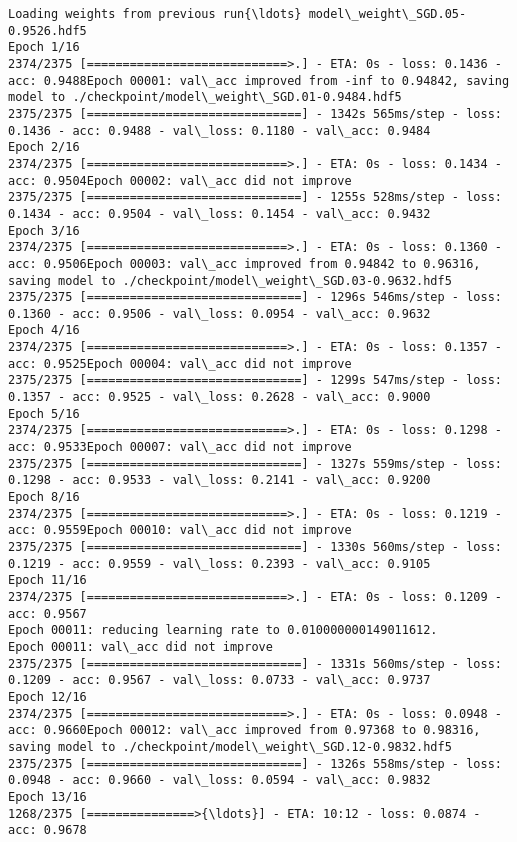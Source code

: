 \documentclass[11pt]{article}
\begin{document}
\begin{Verbatim}[commandchars=\\\{\}]
Loading weights from previous run{\ldots} model\_weight\_SGD.05-0.9526.hdf5
Epoch 1/16
2374/2375 [============================>.] - ETA: 0s - loss: 0.1436 - acc: 0.9488Epoch 00001: val\_acc improved from -inf to 0.94842, saving model to ./checkpoint/model\_weight\_SGD.01-0.9484.hdf5
2375/2375 [==============================] - 1342s 565ms/step - loss: 0.1436 - acc: 0.9488 - val\_loss: 0.1180 - val\_acc: 0.9484
Epoch 2/16
2374/2375 [============================>.] - ETA: 0s - loss: 0.1434 - acc: 0.9504Epoch 00002: val\_acc did not improve
2375/2375 [==============================] - 1255s 528ms/step - loss: 0.1434 - acc: 0.9504 - val\_loss: 0.1454 - val\_acc: 0.9432
Epoch 3/16
2374/2375 [============================>.] - ETA: 0s - loss: 0.1360 - acc: 0.9506Epoch 00003: val\_acc improved from 0.94842 to 0.96316, saving model to ./checkpoint/model\_weight\_SGD.03-0.9632.hdf5
2375/2375 [==============================] - 1296s 546ms/step - loss: 0.1360 - acc: 0.9506 - val\_loss: 0.0954 - val\_acc: 0.9632
Epoch 4/16
2374/2375 [============================>.] - ETA: 0s - loss: 0.1357 - acc: 0.9525Epoch 00004: val\_acc did not improve
2375/2375 [==============================] - 1299s 547ms/step - loss: 0.1357 - acc: 0.9525 - val\_loss: 0.2628 - val\_acc: 0.9000
Epoch 5/16
2374/2375 [============================>.] - ETA: 0s - loss: 0.1298 - acc: 0.9533Epoch 00007: val\_acc did not improve
2375/2375 [==============================] - 1327s 559ms/step - loss: 0.1298 - acc: 0.9533 - val\_loss: 0.2141 - val\_acc: 0.9200
Epoch 8/16
2374/2375 [============================>.] - ETA: 0s - loss: 0.1219 - acc: 0.9559Epoch 00010: val\_acc did not improve
2375/2375 [==============================] - 1330s 560ms/step - loss: 0.1219 - acc: 0.9559 - val\_loss: 0.2393 - val\_acc: 0.9105
Epoch 11/16
2374/2375 [============================>.] - ETA: 0s - loss: 0.1209 - acc: 0.9567
Epoch 00011: reducing learning rate to 0.010000000149011612.
Epoch 00011: val\_acc did not improve
2375/2375 [==============================] - 1331s 560ms/step - loss: 0.1209 - acc: 0.9567 - val\_loss: 0.0733 - val\_acc: 0.9737
Epoch 12/16
2374/2375 [============================>.] - ETA: 0s - loss: 0.0948 - acc: 0.9660Epoch 00012: val\_acc improved from 0.97368 to 0.98316, saving model to ./checkpoint/model\_weight\_SGD.12-0.9832.hdf5
2375/2375 [==============================] - 1326s 558ms/step - loss: 0.0948 - acc: 0.9660 - val\_loss: 0.0594 - val\_acc: 0.9832
Epoch 13/16
1268/2375 [===============>{\ldots}] - ETA: 10:12 - loss: 0.0874 - acc: 0.9678
    \end{Verbatim}
\end{document}
